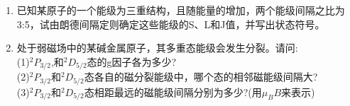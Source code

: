 \begin{enumerate}
(4)碳$2p3s^3P_0 \to 2p^{23}P_0$;\\
(5)钠 $2p^6 4d^2D_{5/2} \to 2p^63p^2P_{1/2}$。
\item 已知某原子的一个能级为三重结构，且随能量的增加，两个能级间隔之比为3:5，试由朗德间隔定则确定这些能级的S、L和J值，并写出状态符号。
\item 处于弱磁场中的某碱金属原子，其多重态能级会发生分裂。请问:\\
(1)$^2P_{3/2}$,和$^2D_{5/2}$态的g因子各为多少?\\
(2)$^2P_{3/2}$和$^2D_{5/2}$态各自的磁分裂能级中，哪个态的相邻磁能级间隔大?\\
(3)$^2P_{3/2}$和$^2D_{5/2}$态相距最远的磁能级间隔分别为多少?(用$\mu_B B$来表示)

\end{enumerate}